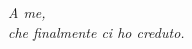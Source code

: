 %
%
\cleardoublepage
%
%
\thispagestyle{empty}
%
%
%
\begin{flushright}
\textit{A me,}\\
\textit{che finalmente ci ho creduto.}
\end{flushright}
%
%
